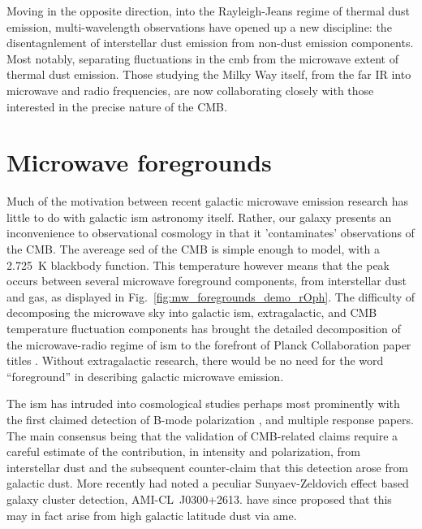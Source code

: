     Moving in the opposite direction, into the Rayleigh-Jeans regime of thermal dust emission, multi-wavelength observations have opened up a new discipline: the disentagnlement of interstellar dust emission from non-dust emission components. Most notably, separating fluctuations in the \acrlong{cmb} from the microwave extent of thermal dust emission. Those studying the Milky Way itself, from the far IR into microwave and radio frequencies, are now collaborating closely with those interested in the precise nature of the CMB.

\section{Microwave foregrounds}

    Much of the motivation between recent galactic microwave emission research has little to do with galactic \acrshort{ism} astronomy itself. Rather, our galaxy presents an inconvenience to observational cosmology in that it 'contaminates' observations of the CMB. The avereage \acrshort{sed} of the CMB is simple enough to model, with a 2.725~K blackbody function. This temperature however means that the peak occurs between several microwave foreground components, from interstellar dust and gas, as displayed in Fig.~\ref{fig:mw_foregrounds_demo_rOph}. The difficulty of decomposing the microwave sky into galactic \acrshort{ism}, extragalactic, and CMB temperature fluctuation components has brought the detailed decomposition of the microwave-radio regime of \acrshort{ism} to the forefront of Planck Collaboration paper titles \citep{planckEarly11I,planck2013I,planck2015I}. Without extragalactic research, there would be no need for the word ``foreground'' in describing galactic microwave emission.

    The \acrshort{ism} has intruded into cosmological studies perhaps most prominently with the first claimed detection of B-mode polarization \citep{hanson13, bicep214, flauger14}, and multiple response papers. The main consensus being that the validation of CMB-related claims require a careful estimate of the contribution, in intensity and polarization, from interstellar dust and the subsequent counter-claim that this detection arose from galactic dust\citep{planckIntL17, sheehy17}. More recently \cite{shimwell12} had noted a peculiar Sunyaev-Zeldovich effect based galaxy cluster detection, AMI-CL~J0300+2613. \cite{perrott18} have since proposed that this may in fact arise from high galactic latitude dust via \acrlong{ame}.

